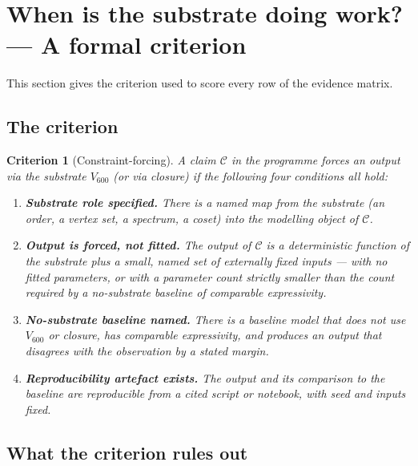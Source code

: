 \documentclass[11pt,a4paper]{article}
\newtheorem{criterion}{Criterion}
\newcommand{\Vsix}{V_{600}}
\begin{document}
\section{When is the substrate doing work? --- A formal criterion}
\label{sec:criterion}

This section gives the criterion used to score every row of the
evidence matrix.

\subsection{The criterion}

\begin{criterion}[Constraint-forcing]
\label{crit:cf}
A claim $\mathcal{C}$ in the programme \emph{forces} an output via
the substrate $\Vsix$ (or via closure) if the following four
conditions all hold:

\begin{enumerate}[leftmargin=*,label=(\roman*)]
  \item \textbf{Substrate role specified.} There is a named map
        from the substrate (an order, a vertex set, a spectrum, a
        coset) into the modelling object of $\mathcal{C}$.
  \item \textbf{Output is forced, not fitted.} The output of
        $\mathcal{C}$ is a deterministic function of the substrate
        plus a small, named set of externally fixed inputs ---
        with no fitted parameters, or with a parameter count
        strictly smaller than the count required by a no-substrate
        baseline of comparable expressivity.
  \item \textbf{No-substrate baseline named.} There is a baseline
        model that does not use $\Vsix$ or closure, has comparable
        expressivity, and produces an output that disagrees with
        the observation by a stated margin.
  \item \textbf{Reproducibility artefact exists.} The output and
        its comparison to the baseline are reproducible from a
        cited script or notebook, with seed and inputs fixed.
\end{enumerate}
\end{criterion}

\subsection{What the criterion rules out}
\end{document}
